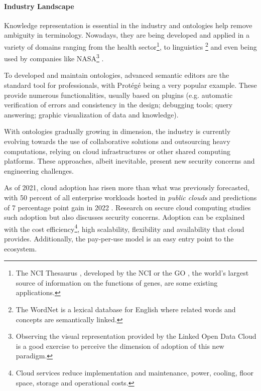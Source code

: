 \paragraph{Industry Landscape} Knowledge representation is essential in the industry \autocite{Noy2019-lj} and ontologies help remove ambiguity in terminology.
Nowadays, they are being developed and applied in a variety of domains \autocite{W3c_undated-pd} ranging from the health sector\footnote{The NCI Thesaurus \autocite{Sioutos2007-ep}, developed by the \gls{NCI} or the \gls{GO} \autocite{Harris2004-tf}, the world’s largest source of information on the functions of genes, are some existing applications.}, to linguistics \footnote{The WordNet \autocite{Miller1995-ic} is a lexical database for English where related words and concepts are semantically linked.} and even being used by companies like NASA\footnote{Observing the visual representation provided by the Linked Open Data Cloud \autocite{McCrae_undated-or} is a good exercise to perceive the dimension of adoption of this new paradigm.} \autocite{Ashish2005-qz}.

To developed and maintain ontologies, advanced semantic editors are the standard tool for professionals, with Protégé \autocite{Musen2015-kh} being a very popular example. These provide numerous functionalities, usually based on plugins (e.g. automatic verification of errors and consistency in the design; debugging tools; query answering; graphic visualization of data and knowledge).

With ontologies gradually growing in dimension, the industry is currently evolving towards the use of collaborative solutions \autocite{Tudorache2008-tu,Tudorache2009-ja} and outsourcing heavy computations, relying on cloud infrastructures or other shared computing platforms. These approaches, albeit inevitable, present new security concerns and engineering challenges.

As of 2021, cloud adoption has risen more than what was previously forecasted, with 50 percent of all enterprise workloads hosted in \emph{public clouds} and predictions of 7 percentage point gain in 2022 \autocite{Security_Compass2021-sh}. Research on secure cloud computing \autocite{Carroll2011-me} studies such adoption but also discusses security concerns. Adoption can be explained with the cost efficiency\footnote{Cloud services reduce implementation and maintenance, power, cooling, floor space, storage and operational costs.}, high scalability, flexibility and availability that cloud provides. Additionally, the pay-per-use model is an easy entry point to the ecosystem.

